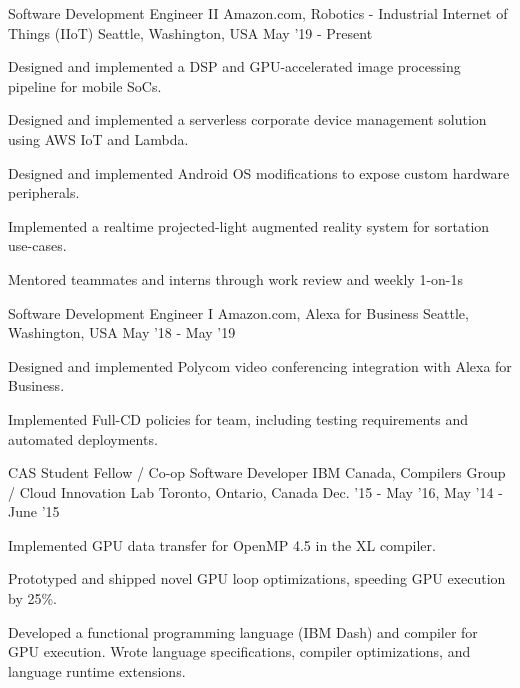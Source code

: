 \begin{cventries}
\cventry
    {Software Development Engineer II} %
    {Amazon.com, Robotics - Industrial Internet of Things (IIoT)} %
    {Seattle, Washington, USA} %
    {May '19 - Present} %
    {
        \begin{cvitems}
            \item Designed and implemented a DSP and GPU-accelerated image processing pipeline for mobile SoCs.
            \item Designed and implemented a serverless corporate device management solution using AWS IoT and Lambda.
            \item Designed and implemented Android OS modifications to expose custom hardware peripherals.
            \item Implemented a realtime projected-light augmented reality system for sortation use-cases.
            \item Mentored teammates and interns through work review and weekly 1-on-1s
        \end{cvitems}
    }
\vspace{3mm}
\cventry
    {Software Development Engineer I} %
    {Amazon.com, Alexa for Business} %
    {Seattle, Washington, USA} %
    {May '18 - May '19} %
    {
        \begin{cvitems}
            \item Designed and implemented Polycom video conferencing integration with Alexa for Business.
            \item Implemented Full-CD policies for team, including testing requirements and automated deployments.
        \end{cvitems}
    }
\vspace{3mm}
\cventry
    {CAS Student Fellow / Co-op Software Developer} %
    {IBM Canada, Compilers Group / Cloud Innovation Lab} %
    {Toronto, Ontario, Canada} %
    {Dec. '15 - May '16, May '14 - June '15} %
    {
        \begin{cvitems}
            \item Implemented GPU data transfer for OpenMP 4.5 in the XL compiler.
            \item Prototyped and shipped novel GPU loop optimizations, speeding GPU execution by 25\%.
            \item Developed a functional programming language (IBM Dash) and compiler for GPU execution. Wrote language specifications, compiler optimizations, and language runtime extensions.

\end{cvitems}}
\end{cventries}
